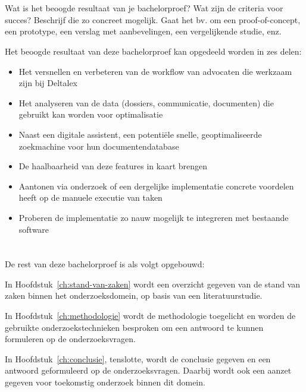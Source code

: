 \section{}%
\label{sec:onderzoeksdoelstelling}
Wat is het beoogde resultaat van je bachelorproef?
Wat zijn de criteria voor succes? Beschrijf die zo concreet mogelijk. Gaat het bv. om een proof-of-concept, een prototype, een verslag met aanbevelingen, een vergelijkende studie, enz.

Het beoogde resultaat van deze bachelorproef kan opgedeeld worden in zes delen:
\begin{itemize}
	\item Het versnellen en verbeteren van de workflow van advocaten die werkzaam zijn bij Deltalex
    \item Het analyseren van de data (dossiers, communicatie, documenten) die gebruikt kan worden voor optimalisatie
    \item Naast een digitale assistent, een potentiële snelle, geoptimaliseerde zoekmachine voor hun documentendatabase
    \item De haalbaarheid van deze features in kaart brengen
    \item Aantonen via onderzoek of een dergelijke implementatie concrete voordelen heeft op de manuele executie van taken
    \item Proberen de implementatie zo nauw mogelijk te integreren met bestaande software
\end{itemize}


\section{}%
\label{sec:opzet-bachelorproef}


De rest van deze bachelorproef is als volgt opgebouwd:

In Hoofdstuk~\ref{ch:stand-van-zaken} wordt een overzicht gegeven van de stand van zaken binnen het onderzoeksdomein, op basis van een literatuurstudie.

In Hoofdstuk~\ref{ch:methodologie} wordt de methodologie toegelicht en worden de gebruikte onderzoekstechnieken besproken om een antwoord te kunnen formuleren op de onderzoeksvragen.


In Hoofdstuk~\ref{ch:conclusie}, tenslotte, wordt de conclusie gegeven en een antwoord geformuleerd op de onderzoeksvragen. Daarbij wordt ook een aanzet gegeven voor toekomstig onderzoek binnen dit domein.
